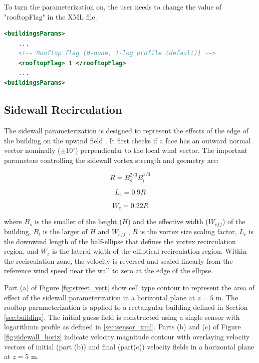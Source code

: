 To turn the parameterization on, the user needs to change the value of "rooftopFlag" in the XML file.

\begin{lstlisting}[language=XML]
<buildingsParams>
	...
	<!-- Rooftop flag (0-none, 1-log profile (default)) -->
	<rooftopFlag> 1 </rooftopFlag> 
	... 				
<buildingsParams>
\end{lstlisting}

\subsection{Sidewall Recirculation}

The sidewall parameterization is designed to represent the effects of the edge of the building on the upwind field \cite{hayati2017comprehensive}. It first checks if a face has an outward normal vector nominally ($\pm 10^{\circ}$) perpendicular to the local wind vector. The important parameters controlling the sidewall vortex strength and geometry are:

\begin{equation}
R=B_{\mathrm{s}}^{2 / 3} B_{l}^{1 / 3}
\end{equation}

\begin{equation}
L_{\mathrm{c}}=0.9 R
\end{equation}

\begin{equation}
W_{\mathrm{c}}=0.22 R
\end{equation}

where $B_s$ is the smaller of the height ($H$) and the effective width ($W_{eff}$) of the
building, $B_l$ is the larger of $H$ and $W_{eff}$ , $R$ is the vortex size scaling factor, $L_c$ is the downwind length of the half-ellipse that defines the vortex recirculation region, and
$W_c$ is the lateral width of the elliptical recirculation region. Within the recirculation zone, the velocity is reversed and scaled linearly from the reference wind speed near the wall to zero at the edge of the ellipse.

Part (a) of Figure \ref{fig:street_vert} show cell type contour to represent the area of effect of the sidewall parameterization in a horizontal plane at $z=5$ m. The rooftop parameterization is applied to a rectangular building defined in Section \ref{sec:building}. The initial guess field is constructed using a single sensor with logarithmic profile as defined in \ref{sec:sensor_xml}. Parts (b) and (c) of Figure \ref{fig:sidewall_horiz} indicate velocity magnitude contour with overlaying velocity vectors of initial (part (b)) and final (part(c)) velocity fields in a horizontal plane at $z=5$ m.

